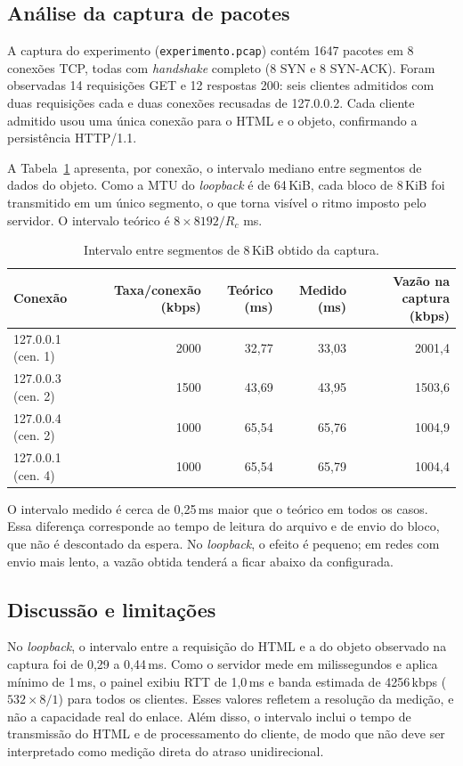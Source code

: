 \documentclass[12pt,a4paper]{article}
\begin{document}
\subsection{Análise da captura de pacotes}

A captura do experimento (\texttt{experimento.pcap}) contém 1647 pacotes em 8 conexões
TCP, todas com \emph{handshake} completo (8 SYN e 8 SYN-ACK). Foram observadas 14
requisições GET e 12 respostas 200: seis clientes admitidos com duas requisições cada e
duas conexões recusadas de 127.0.0.2. Cada cliente admitido usou uma única conexão para o
HTML e o objeto, confirmando a persistência HTTP/1.1.

A Tabela~\ref{tab:pcap} apresenta, por conexão, o intervalo mediano entre segmentos de
dados do objeto. Como a MTU do \emph{loopback} é de 64\,KiB, cada bloco de 8\,KiB foi
transmitido em um único segmento, o que torna visível o ritmo imposto pelo servidor. O
intervalo teórico é $8 \times 8192 / R_c$ ms.

\begin{table}[h]
\centering
\caption{Intervalo entre segmentos de 8\,KiB obtido da captura.}
\label{tab:pcap}
\small
\begin{tabular}{@{}lrrrr@{}}
\toprule
\textbf{Conexão} & \textbf{Taxa/conexão (kbps)} & \textbf{Teórico (ms)} & \textbf{Medido (ms)} & \textbf{Vazão na captura (kbps)} \\
\midrule
127.0.0.1 (cen. 1) & 2000 & 32,77 & 33,03 & 2001,4 \\
127.0.0.3 (cen. 2) & 1500 & 43,69 & 43,95 & 1503,6 \\
127.0.0.4 (cen. 2) & 1000 & 65,54 & 65,76 & 1004,9 \\
127.0.0.1 (cen. 4) & 1000 & 65,54 & 65,79 & 1004,4 \\
\bottomrule
\end{tabular}
\end{table}

O intervalo medido é cerca de 0,25\,ms maior que o teórico em todos os casos. Essa
diferença corresponde ao tempo de leitura do arquivo e de envio do bloco, que não é
descontado da espera. No \emph{loopback}, o efeito é pequeno; em redes com envio mais lento,
a vazão obtida tenderá a ficar abaixo da configurada.

\subsection{Discussão e limitações}

No \emph{loopback}, o intervalo entre a requisição do HTML e a do objeto observado na
captura foi de 0,29 a 0,44\,ms. Como o servidor mede em milissegundos e aplica mínimo de
1\,ms, o painel exibiu RTT de 1,0\,ms e banda estimada de 4256\,kbps ($532 \times 8 / 1$)
para todos os clientes. Esses valores refletem a resolução da medição, e não a capacidade
real do enlace. Além disso, o intervalo inclui o tempo de transmissão do HTML e de
processamento do cliente, de modo que não deve ser interpretado como medição direta do
atraso unidirecional.
\end{document}
